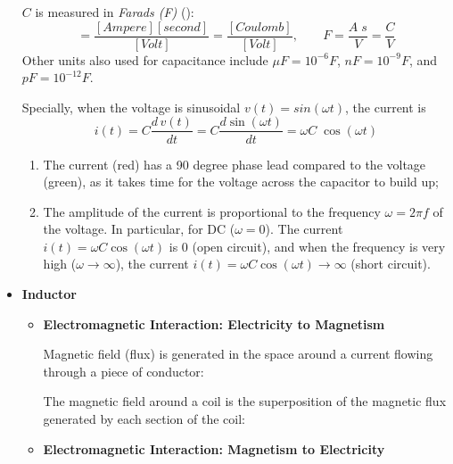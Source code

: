 \documentclass{article}
\begin{document}
\begin{itemize}
  $C$ is measured in {\em Farads (F)} 
  ():
  \begin{equation} 
    [Farad]=\frac{[Ampere][second]}{[Volt]} =\frac{[Coulomb]}{[Volt]},
    \;\;\;\;\;\;\;
    F=\frac{A\;s}{V}=\frac{C}{V}
  \end{equation}
  Other units also used for capacitance include $\mu F=10^{-6} F$, 
  $nF=10^{-9}F$, and $pF=10^{-12}F$.

  Specially, when the voltage is sinusoidal $v(t)=sin(\omega t)$, the 
  current is
  \begin{equation}
    i(t)=C \frac{d\,v(t)}{dt}=C \frac{d\sin(\omega t)}{dt}
    =\omega C\;\cos(\omega t)
  \end{equation}
  

  \begin{enumerate}
  \item The current (red) has a 90 degree phase lead compared to 
    the voltage (green), as it takes time for the voltage across the 
    capacitor to build up;
  \item The amplitude of the current is proportional to the frequency 
    $\omega=2\pi f$ of the voltage. In particular, for DC ($\omega=0$). 
    The current $i(t)=\omega C\cos(\omega t)$ is 0 (open circuit), and
    when the frequency is very high ($\omega \rightarrow \infty$), the 
    current $i(t)=\omega C\cos(\omega t) \rightarrow \infty$ (short circuit).
  \end{enumerate}


\item {\bf Inductor}

  \begin{itemize}
  \item {\bf Electromagnetic Interaction: Electricity to Magnetism}

    Magnetic field (flux) is generated in the space around a current 
    flowing through a piece of conductor:


    The magnetic field around a coil is the superposition of the magnetic 
    flux generated by each section of the coil:


  \item {\bf Electromagnetic Interaction: Magnetism to Electricity}


\end{itemize}
\end{itemize}
\end{document}
